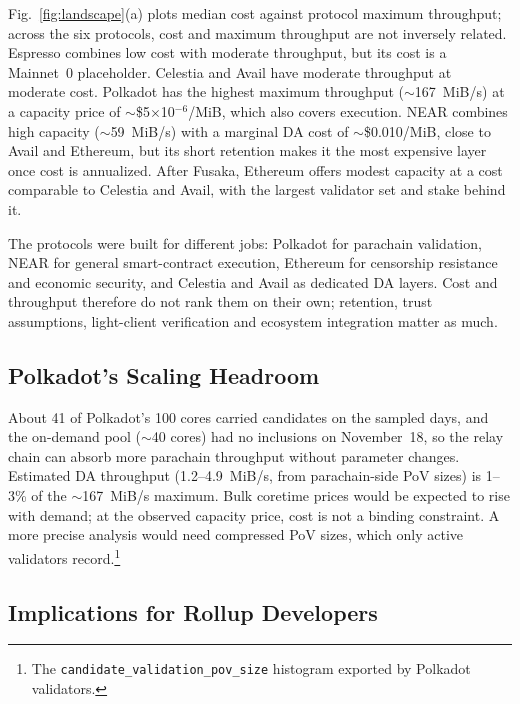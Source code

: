 Fig.~\ref{fig:landscape}(a) plots median cost against protocol maximum throughput; across the six protocols, cost and maximum throughput are not inversely related.
Espresso combines low cost with moderate throughput, but its cost is a Mainnet~0 placeholder.
Celestia and Avail have moderate throughput at moderate cost.
Polkadot has the highest maximum throughput ($\sim$167~MiB/s) at a capacity price of $\sim$\$5$\times$10$^{-6}$/MiB, which also covers execution.
NEAR combines high capacity ($\sim$59~MiB/s) with a marginal DA cost of $\sim$\$0.010/MiB, close to Avail and Ethereum, but its short retention makes it the most expensive layer once cost is annualized.
After Fusaka, Ethereum offers modest capacity at a cost comparable to Celestia and Avail, with the largest validator set and stake behind it.

The protocols were built for different jobs: Polkadot for parachain validation, NEAR for general smart-contract execution, Ethereum for censorship resistance and economic security, and Celestia and Avail as dedicated DA layers.
Cost and throughput therefore do not rank them on their own; retention, trust assumptions, light-client verification and ecosystem integration matter as much.

\subsection{Polkadot's Scaling Headroom}
\label{sec:disc-polkadot}
About 41 of Polkadot's 100 cores carried candidates on the sampled days, and the on-demand pool ($\sim$40 cores) had no inclusions on November~18, so the relay chain can absorb more parachain throughput without parameter changes. Estimated DA throughput (1.2--4.9~MiB/s, from parachain-side PoV sizes) is 1--3\% of the $\sim$167~MiB/s maximum.
Bulk coretime prices would be expected to rise with demand; at the observed capacity price, cost is not a binding constraint.
A more precise analysis would need compressed PoV sizes, which only active validators record.\footnote{The \texttt{candidate\_validation\_pov\_size} histogram exported by Polkadot validators.}

\subsection{Implications for Rollup Developers}
\label{sec:disc-rollups}

